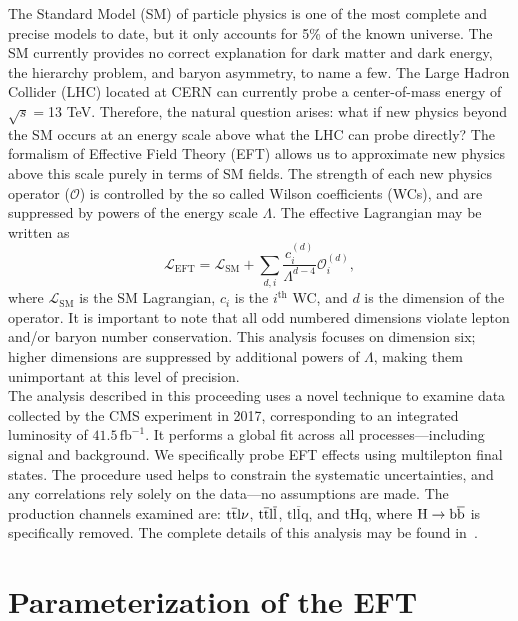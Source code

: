 \documentclass[12pt]{article}
\begin{document}
The Standard Model (SM) of particle physics is one of the most complete and precise models to date, but it only accounts for 5\% of the known universe. The SM currently provides no correct explanation for dark matter and dark energy, the hierarchy problem, and baryon asymmetry, to name a few. The Large Hadron Collider (LHC) located at CERN can currently probe a center-of-mass energy of $\sqrt{s}=$13 TeV. Therefore, the natural question arises: what if new physics beyond the SM occurs at an energy scale above what the LHC can probe directly? The formalism of Effective Field Theory (EFT) allows us to approximate new physics above this scale purely in terms of SM fields. The strength of each new physics operator ($\mathcal{O}$) is controlled by the so called Wilson coefficients (WCs), and are suppressed by powers of the energy scale $\Lambda$. The effective Lagrangian may be written as
\begin{equation}
	\mathcal{L}_{\mathrm{EFT}} = \mathcal{L}_{\mathrm{SM}} + \sum_{d,i} \frac{c_i^{(d)}}{\Lambda^{d-4}}\mathcal{O}_{i}^{(d)},
\end{equation}
where $\mathcal{L}_{\mathrm{SM}}$ is the SM Lagrangian, $c_{i}$ is the $i^{\mathrm{th}}$ WC, and $d$ is the dimension of the operator. It is important to note that all odd numbered dimensions violate lepton and/or baryon number conservation. This analysis focuses on dimension six; higher dimensions are suppressed by additional powers of $\Lambda$, making them unimportant at this level of precision.\\

The analysis described in this proceeding uses a novel technique to examine data collected by the CMS experiment in 2017, corresponding to an integrated luminosity of $41.5\,\mathrm{fb^{-1}}$. It performs a global fit across all processes---including signal and background. We specifically probe EFT effects using multilepton final states. The procedure used helps to constrain the systematic uncertainties, and any correlations rely solely on the data---no assumptions are made. The production channels examined are: $\mathrm{\mathrm{t\overline{t}} l\nu}$, $\mathrm{\mathrm{t\overline{t}} l\overline{l}}$, $\mathrm{t l\overline{l}q}$, and $\mathrm{tHq}$, where $\mathrm{H \to \mathrm{b\overline{b}}}$ is specifically removed. The complete details of this analysis may be found in~\cite{Sirunyan:2020tqm}.\\

\section{Parameterization of the EFT}
\end{document}
